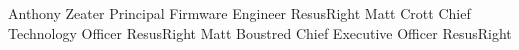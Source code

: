 %
%
%


\begin{referees}
		{Anthony Zeater}
		{Principal Firmware Engineer}
		{ResusRight}
		{ }
		{Matt Crott}
		{Chief Technology Officer}
		{ResusRight}
		{ }
		{Matt Boustred}
		{Chief Executive Officer}
		{ResusRight}
		{ }
\end{referees}